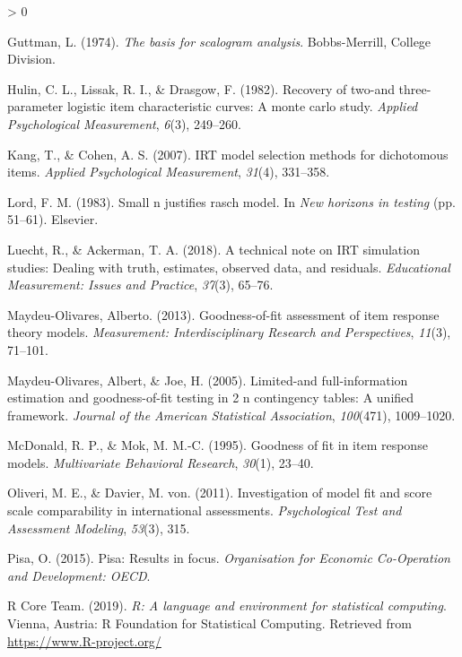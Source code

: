 \documentclass[
  english,
  man,floatsintext]{apa7}
\newlength{\cslhangindent}
\newenvironment{CSLReferences}[2] %
 {%
  \setlength{\parindent}{0pt}
  \ifodd #1 \everypar{\setlength{\hangindent}{\cslhangindent}}\ignorespaces\fi
  \ifnum #2 > 0
  \setlength{\parskip}{#2\baselineskip}
  \fi
 }%
 {}
\begin{document}
\begin{CSLReferences}{1}{0}
\leavevmode\hypertarget{ref-guttman1974basis}{}%
Guttman, L. (1974). \emph{The basis for scalogram analysis}. Bobbs-Merrill, College Division.

\leavevmode\hypertarget{ref-hulin1982recovery}{}%
Hulin, C. L., Lissak, R. I., \& Drasgow, F. (1982). Recovery of two-and three-parameter logistic item characteristic curves: A monte carlo study. \emph{Applied Psychological Measurement}, \emph{6}(3), 249--260.

\leavevmode\hypertarget{ref-kang2007irt}{}%
Kang, T., \& Cohen, A. S. (2007). IRT model selection methods for dichotomous items. \emph{Applied Psychological Measurement}, \emph{31}(4), 331--358.

\leavevmode\hypertarget{ref-lord1983small}{}%
Lord, F. M. (1983). Small n justifies rasch model. In \emph{New horizons in testing} (pp. 51--61). Elsevier.

\leavevmode\hypertarget{ref-luecht2018technical}{}%
Luecht, R., \& Ackerman, T. A. (2018). A technical note on IRT simulation studies: Dealing with truth, estimates, observed data, and residuals. \emph{Educational Measurement: Issues and Practice}, \emph{37}(3), 65--76.

\leavevmode\hypertarget{ref-maydeu2013goodness}{}%
Maydeu-Olivares, Alberto. (2013). Goodness-of-fit assessment of item response theory models. \emph{Measurement: Interdisciplinary Research and Perspectives}, \emph{11}(3), 71--101.

\leavevmode\hypertarget{ref-maydeu2005limited}{}%
Maydeu-Olivares, Albert, \& Joe, H. (2005). Limited-and full-information estimation and goodness-of-fit testing in 2 n contingency tables: A unified framework. \emph{Journal of the American Statistical Association}, \emph{100}(471), 1009--1020.

\leavevmode\hypertarget{ref-mcdonald1995goodness}{}%
McDonald, R. P., \& Mok, M. M.-C. (1995). Goodness of fit in item response models. \emph{Multivariate Behavioral Research}, \emph{30}(1), 23--40.

\leavevmode\hypertarget{ref-oliveri2011investigation}{}%
Oliveri, M. E., \& Davier, M. von. (2011). Investigation of model fit and score scale comparability in international assessments. \emph{Psychological Test and Assessment Modeling}, \emph{53}(3), 315.

\leavevmode\hypertarget{ref-pisa2015pisa}{}%
Pisa, O. (2015). Pisa: Results in focus. \emph{Organisation for Economic Co-Operation and Development: OECD}.

\leavevmode\hypertarget{ref-rcore}{}%
R Core Team. (2019). \emph{R: A language and environment for statistical computing}. Vienna, Austria: R Foundation for Statistical Computing. Retrieved from \url{https://www.R-project.org/}


\end{CSLReferences}
\end{document}
